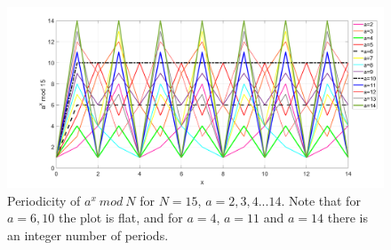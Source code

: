 \documentclass[conference,twoside]{IEEEtran}
\begin{document}
\begin{figure}[t]
    \centering  \includegraphics[width=1\columnwidth,keepaspectratio]{Figure_a_x_mod_N.png}
    \caption{Periodicity of $a^{x} \ mod \ N$ for $N = 15$, $a = {2, 3, 4... 14}$. Note that for $a=6, 10$ the plot is flat, and for $a=4$, $a=11$ and $a=14$ there is an integer number of periods.}
    \label{fig:fig3}
\end{figure}
\end{document}
